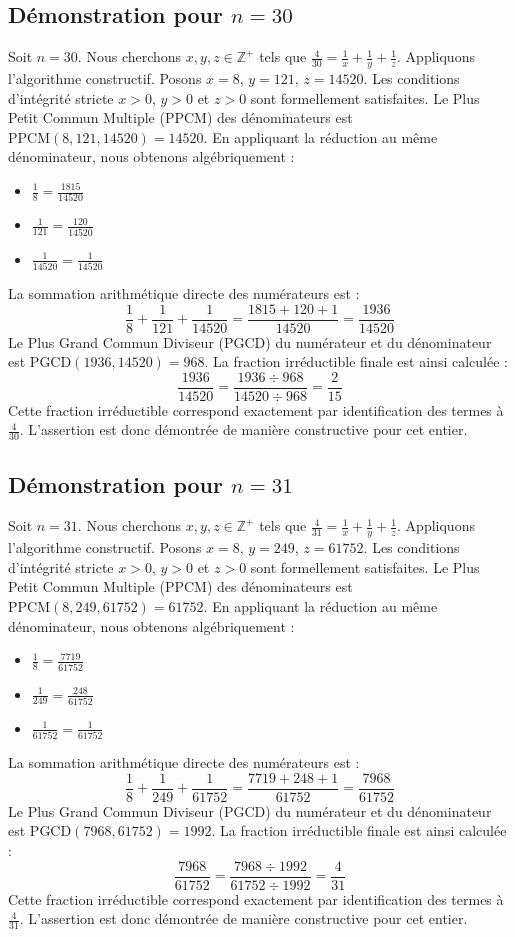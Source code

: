 \documentclass[11pt,a4paper]{article}
\begin{document}
\subsection{Démonstration pour $n = 30$}
Soit $n = 30$. Nous cherchons $x, y, z \in \mathbb{Z}^{+}$ tels que $\frac{4}{30} = \frac{1}{x} + \frac{1}{y} + \frac{1}{z}$.
Appliquons l'algorithme constructif. Posons $x = 8$, $y = 121$, $z = 14520$.
Les conditions d'intégrité stricte $x > 0$, $y > 0$ et $z > 0$ sont formellement satisfaites.
Le Plus Petit Commun Multiple (PPCM) des dénominateurs est $\text{PPCM}(8, 121, 14520) = 14520$.
En appliquant la réduction au même dénominateur, nous obtenons algébriquement :
\begin{itemize}
    \item $\frac{1}{8} = \frac{1815}{14520}$
    \item $\frac{1}{121} = \frac{120}{14520}$
    \item $\frac{1}{14520} = \frac{1}{14520}$
\end{itemize}
La sommation arithmétique directe des numérateurs est :
$$ \frac{1}{8} + \frac{1}{121} + \frac{1}{14520} = \frac{1815 + 120 + 1}{14520} = \frac{1936}{14520} $$
Le Plus Grand Commun Diviseur (PGCD) du numérateur et du dénominateur est $\text{PGCD}(1936, 14520) = 968$.
La fraction irréductible finale est ainsi calculée :
$$ \frac{1936}{14520} = \frac{1936 \div 968}{14520 \div 968} = \frac{2}{15} $$
Cette fraction irréductible correspond exactement par identification des termes à $\frac{4}{30}$. L'assertion est donc démontrée de manière constructive pour cet entier.

\subsection{Démonstration pour $n = 31$}
Soit $n = 31$. Nous cherchons $x, y, z \in \mathbb{Z}^{+}$ tels que $\frac{4}{31} = \frac{1}{x} + \frac{1}{y} + \frac{1}{z}$.
Appliquons l'algorithme constructif. Posons $x = 8$, $y = 249$, $z = 61752$.
Les conditions d'intégrité stricte $x > 0$, $y > 0$ et $z > 0$ sont formellement satisfaites.
Le Plus Petit Commun Multiple (PPCM) des dénominateurs est $\text{PPCM}(8, 249, 61752) = 61752$.
En appliquant la réduction au même dénominateur, nous obtenons algébriquement :
\begin{itemize}
    \item $\frac{1}{8} = \frac{7719}{61752}$
    \item $\frac{1}{249} = \frac{248}{61752}$
    \item $\frac{1}{61752} = \frac{1}{61752}$
\end{itemize}
La sommation arithmétique directe des numérateurs est :
$$ \frac{1}{8} + \frac{1}{249} + \frac{1}{61752} = \frac{7719 + 248 + 1}{61752} = \frac{7968}{61752} $$
Le Plus Grand Commun Diviseur (PGCD) du numérateur et du dénominateur est $\text{PGCD}(7968, 61752) = 1992$.
La fraction irréductible finale est ainsi calculée :
$$ \frac{7968}{61752} = \frac{7968 \div 1992}{61752 \div 1992} = \frac{4}{31} $$
Cette fraction irréductible correspond exactement par identification des termes à $\frac{4}{31}$. L'assertion est donc démontrée de manière constructive pour cet entier.
\end{document}
